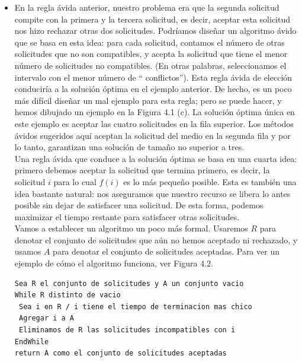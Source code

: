 \documentclass[a4paper, 12pt]{book}
\theoremstyle{dotless}
\begin{document}
\begin{itemize}
\item	 En la regla ávida anterior, nuestro problema era que la segunda solicitud compite con la primera y la tercera solicitud, es decir, aceptar esta solicitud nos hizo rechazar otras dos solicitudes. Podríamos diseñar un algoritmo ávido que se basa en esta idea: para cada solicitud, contamos el número de otras solicitudes que no son compatibles, y acepta la solicitud que tiene el menor número de solicitudes no compatibles. (En otras palabras, seleccionamos el intervalo con el menor número de `` conflictos''). Esta regla ávida de elección conduciría a la solución óptima en el ejemplo anterior. De hecho, es un poco más difícil diseñar un mal ejemplo para esta regla; pero se puede hacer, y hemos dibujado un ejemplo en la Figura 4.1 (c). La solución óptima única en este ejemplo es aceptar las cuatro solicitudes en la fila superior. Los métodos ávidos sugeridos aquí aceptan la solicitud del medio en la segunda fila y por lo tanto, garantizan una solución de tamaño no superior a tres.\\

Una regla ávida que conduce a la solución óptima se basa en una cuarta idea: primero debemos aceptar la solicitud que termina primero, es decir, la solicitud $i$ para lo cual $f (i)$ es lo más pequeño posible. Esta es también una idea bastante natural: nos aseguramos que nuestro recurso se libera lo antes posible sin dejar de satisfacer una solicitud. De esta forma, podemos maximizar el tiempo restante para satisfacer otras solicitudes.\\

Vamos a establecer un algoritmo un poco más formal. Usaremos $R$ para denotar el conjunto de solicitudes que aún no hemos aceptado ni rechazado, y usamos $A$ para denotar el conjunto de solicitudes aceptadas. Para ver un ejemplo de cómo el algoritmo funciona, ver Figura 4.2.\\

\begin{lstlisting}
Sea R el conjunto de solicitudes y A un conjunto vacio
While R distinto de vacio
 Sea i en R / i tiene el tiempo de terminacion mas chico
 Agregar i a A
 Eliminamos de R las solicitudes incompatibles con i
EndWhile
return A como el conjunto de solicitudes aceptadas
\end{lstlisting}

\end{itemize}
\end{document}
